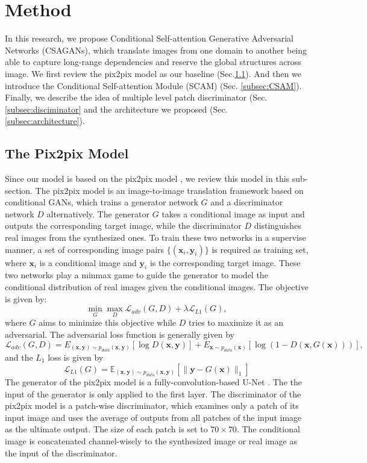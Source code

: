 \section{Method}
\label{sec:method}
In this research, we propose Conditional Self-attention Generative Adversarial Networks (CSAGANs), which translate images from one domain to another being able to capture long-range dependencies and reserve the global structures across image. We first review the pix2pix model as our baseline (Sec.\ref{subsec:pix2pix}). And then we introduce the Conditional Self-attention Module (SCAM) (Sec. \ref{subsec:CSAM}). Finally, we describe the idea of multiple level patch discriminator (Sec.\ref{subsec:disciminator} and the architecture we proposed (Sec. \ref{subsec:architecture}).
\subsection{The Pix2pix Model}
\label{subsec:pix2pix}
Since our model is based on the pix2pix model \cite{pix2pix}, we review this model in this sub-section. The pix2pix model is an image-to-image translation framework based on conditional GANs, which trains a generator network $G$ and a discriminator network $D$ alternatively. The generator $G$ takes a conditional image as input and outputs the corresponding target image, while the discriminator $D$ distinguishes real images from the synthesized ones. To train these two networks in a supervise manner, a set of corresponding image pairs $\{(\bm{x}_i, \bm{y}_i)\}$ is required as training set, where $\bm{x}_i$ is a conditional image and $\bm{y}_i$ is the corresponding target image. These two networks play a minmax game to guide the generator to model the conditional distribution of real images given the conditional images. The objective is given by:
\begin{equation}
\label{eqn:minmax_game}
\min_G \max_D \mathcal{L}_{adv}(G,D)+\lambda \mathcal{L}_{L1}(G),
\end{equation}
where $G$ aims to minimize this objective while $D$ tries to maximize it as an adversarial.
The adversarial loss function is generally given by 
\begin{equation}
\label{eqn:loss_adv}
\mathcal{L}_{adv}(G,D)=E_{(\bm{x},\bm{y})\sim p_{data}(\bm{x},\bm{y})}[\log D(\bm{x},\bm{y})]+E_{\bm{x}\sim p_{data}(\bm{x})}[\log(1-D(\bm{x},G(\bm{x})))],
\end{equation}
and the $L_1$ loss is given by
\begin{equation}
\label{eqn:loss_l1}
\mathcal{L}_{L1}(G)=\mathbb{E}_{(\bm{x},\bm{y})\sim p_{data}(\bm{x},\bm{y})}[\|\bm{y}-G(\bm{x})\|_1]
\end{equation}
The generator of the pix2pix model is a fully-convolution-based U-Net \cite{Unet}. The the input of the generator is only applied to the first layer. The discriminator of the pix2pix model is a patch-wise discriminator, which examines only a patch of its input image and uses the average of outputs from all patches of the input image as the ultimate output. The size of each patch is set to $70\times 70$. The conditional image is concatenated channel-wisely to the synthesized image or real image as the input of the discriminator. 

